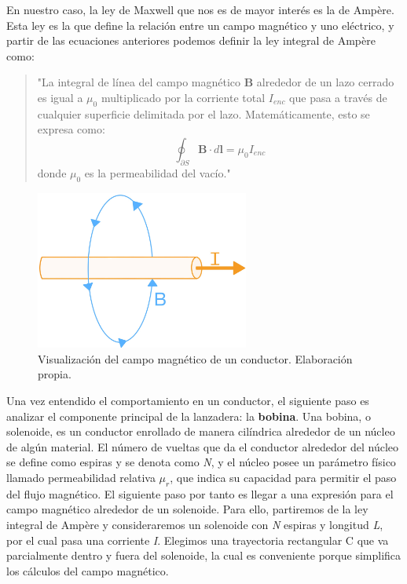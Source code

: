 En nuestro caso, la ley de Maxwell que nos es de mayor interés es la de Ampère. Esta ley es la que define la relación entre un campo magnético y uno eléctrico, y partir de las ecuaciones anteriores podemos definir la ley integral de Ampère como:

\begin{quote}
    "La integral de línea del campo magnético \(\mathbf{B}\) alrededor de un lazo cerrado es igual a \(\mu_0\) multiplicado por la corriente total \(I_{enc}\) que pasa a través de cualquier superficie delimitada por el lazo. Matemáticamente, esto se expresa como:
    \[
    \oint_{\partial S} \mathbf{B} \cdot d\mathbf{l} = \mu_0 I_{enc}
    \]
    donde \(\mu_0\) es la permeabilidad del vacío."
\end{quote}

\begin{figure}[H]
    \centering %
    \includegraphics[width=7cm]{FigurasMemoria/amperelaw.jpg}
    \caption{Visualización del campo magnético de un conductor. Elaboración propia.}
    \label{fig:amperelaw} %
\end{figure}

Una vez entendido el comportamiento en un conductor, el siguiente paso es analizar el componente principal de la lanzadera: la \textbf{bobina}. Una bobina, o solenoide, es un conductor enrollado de manera cilíndrica alrededor de un núcleo de algún material. El número de vueltas que da el conductor alrededor del núcleo se define como espiras y se denota como \textit{N}, y el núcleo posee un parámetro físico llamado permeabilidad relativa \textit{\(\mu_r\)}, que indica su capacidad para permitir el paso del flujo magnético. El siguiente paso por tanto es llegar a una expresión para el campo magnético alrededor de un solenoide. Para ello, partiremos de la ley integral de Ampère y consideraremos un solenoide con \textit{N} espiras y longitud \textit{L}, por el cual pasa una corriente \textit{I}. Elegimos una trayectoria rectangular C que va parcialmente dentro y fuera del solenoide, la cual es conveniente porque simplifica los cálculos del campo magnético.

